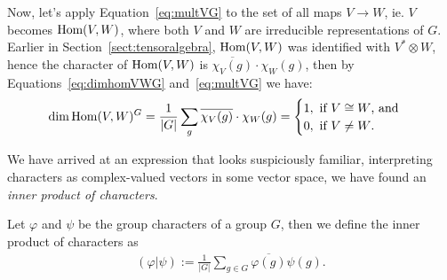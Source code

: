 Now, let's apply Equation~\ref{eq:multVG} to the set of all maps $V \rightarrow W$, ie. $V$ becomes $\text{Hom} (V,W)$, where both $V$ and $W$ are irreducible representations of $G$. Earlier in Section~\ref{sect:tensoralgebra}, $\text{Hom}(V,W)$ was identified with $V^* \otimes W$, hence the character of $\text{Hom}(V,W)$ is $\overline{\chi_V(g)}\cdot\chi_W(g)$, then by Equations~\ref{eq:dimhomVWG} and~\ref{eq:multVG} we have:
\begin{align*}
	\dim \text{Hom}(V,W)^G = \frac{1}{|G|} \sum_g \overline{\chi_V(g)}\cdot\chi_W(g) = \begin{cases}
		1, \text{ if $V \cong W$, and} \\
		0, \text{ if $V \neq W$.}
	\end{cases}
\end{align*}

We have arrived at an expression that looks suspiciously familiar, interpreting characters as complex-valued vectors in some vector space, we have found an \textit{inner product of characters}.

\begin{definition}
	Let $\varphi$ and $\psi$ be the group characters of a group $G$, then we define the inner product of characters as
	\begin{align*}
		(\varphi | \psi) := \frac{1}{|G|} \sum_{g \in G} \overline{\varphi(g)} {\psi(g)}.
	\end{align*}
\end{definition}

